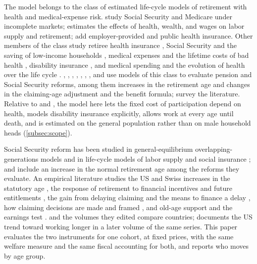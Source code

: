 The model belongs to the class of estimated life-cycle models of retirement with health and medical-expense risk. \citet{Rust1997} study Social Security and Medicare under incomplete markets; \citet{french2005effects} estimates the effects of health, wealth, and wages on labor supply and retirement; \citet{french2011effects} add employer-provided and public health insurance. Other members of the class study retiree health insurance \citep{Blau2008b}, Social Security and the saving of low-income households \citep{vanderklaauw2008social}, medical expenses and the lifetime costs of bad health \citep{Denardi2010,Denardi2018}, disability insurance \citep{Low2015}, and medical spending and the evolution of health over the life cycle \citep{Pashchenko2019,hosseini2022evolution}. \citet{Haan2014}, \citet{laun2019health}, \citet{Li2018}, \citet{iskhakov2021effects}, \citet{Jones2023}, \citet{Bairoliya2023}, \citet{Borella2023}, and \citet{Yu2024} use models of this class to evaluate pension and Social Security reforms, among them increases in the retirement age and changes in the claiming-age adjustment and the benefit formula; \citet{blundell2016retirement} survey the literature. Relative to \citet{french2005effects} and \citet{french2011effects}, the model here lets the fixed cost of participation depend on health, models disability insurance explicitly, allows work at every age until death, and is estimated on the general population rather than on male household heads (\autoref{subsec:scope}).

Social Security reform has been studied in general-equilibrium overlapping-generations models \citep{nishiyama2007does,Imrohoroglu2012,kitao2014sustainable} and in life-cycle models of labor supply and social insurance \citep{huggett2010well,Erosa2012}; \citet{Imrohoroglu2012} and \citet{kitao2014sustainable} include an increase in the normal retirement age among the reforms they evaluate. An empirical literature studies the US and Swiss increases in the statutory age \citep{mastrobuoni2009labor,behagel2012,deshpande2024sticky,lalive2023social}, the response of retirement to financial incentives and future entitlements \citep{coile2007future,manoli2016nonparametric}, the gain from delaying claiming and the means to finance a delay \citep{shoven2014does,goda2018financial}, how claiming decisions are made and framed \citep{shoven2017,brown2016framing,liebman2015would,seibold2021reference}, and old-age support and the earnings test \citep{fetter2018government,gelber2020employment}. \citet{gruber1998social} and the volumes they edited \citeyearpar{gruber1999social,Gruberwise2002,gruber2009social} compare countries; \citet{Coile2019} documents the US trend toward working longer in a later volume of the same series. This paper evaluates the two instruments for one cohort, at fixed prices, with the same welfare measure and the same fiscal accounting for both, and reports who moves by age group.

